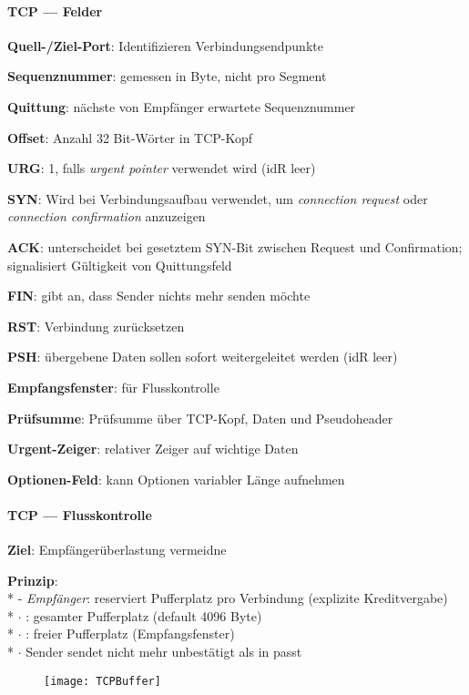 \paragraph{TCP --- Felder}
\begin{items}
  \item \textbf{Quell-/Ziel-Port}: Identifizieren Verbindungsendpunkte
  \item \textbf{Sequenznummer}: gemessen in Byte, nicht pro Segment
  \item \textbf{Quittung}: nächste von Empfänger erwartete Sequenznummer
  \item \textbf{Offset}: Anzahl 32 Bit-Wörter in TCP-Kopf
  \item \textbf{URG}: 1, falls \emph{urgent pointer} verwendet wird (idR leer)
  \item \textbf{SYN}: Wird bei Verbindungsaufbau verwendet, um \emph{connection request} oder \emph{connection confirmation} anzuzeigen
  \item \textbf{ACK}: unterscheidet bei gesetztem SYN-Bit zwischen Request und Confirmation; signalisiert Gültigkeit von Quittungsfeld
  \item \textbf{FIN}: gibt an, dass Sender nichts mehr senden möchte
  \item \textbf{RST}: Verbindung zurücksetzen
  \item \textbf{PSH}: übergebene Daten sollen sofort weitergeleitet werden (idR leer)
  \item \textbf{Empfangsfenster}: für Flusskontrolle
  \item \textbf{Prüfsumme}: Prüfsumme über TCP-Kopf, Daten und Pseudoheader
  \item \textbf{Urgent-Zeiger}: relativer Zeiger auf wichtige Daten
  \item \textbf{Optionen-Feld}: kann Optionen variabler Länge aufnehmen
\end{items}

\paragraph{TCP --- Flusskontrolle}
\begin{items}
  \item \textbf{Ziel}: Empfängerüberlastung vermeidne
  \item \textbf{Prinzip}: \\*
    - \emph{Empfänger}: reserviert Pufferplatz pro Verbindung (explizite Kreditvergabe) \\*
    \phantom{-} \( \cdot \) : gesamter Pufferplatz (default 4096 Byte) \\*
    \phantom{-} \( \cdot \) : freier Pufferplatz (Empfangsfenster) \\*
    \phantom{-} \( \cdot \) Sender sendet nicht mehr unbestätigt als in  passt
\end{items}
\begin{figure}[H]\centering\label{TCPBuffer}\texttt{[image: TCPBuffer]}\end{figure}

